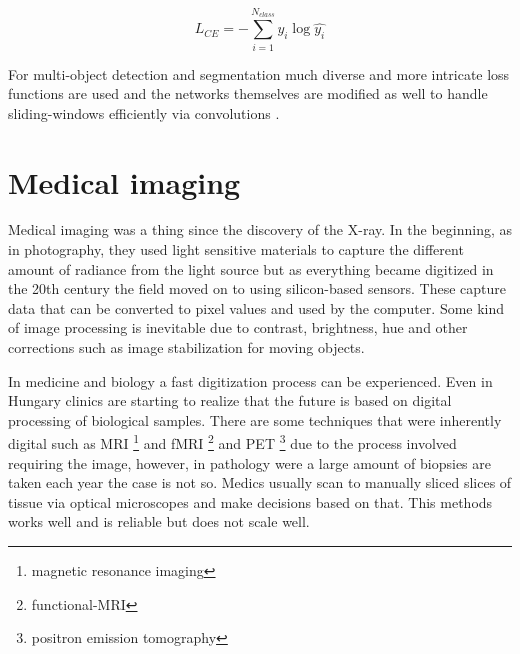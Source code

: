 \documentclass[a4paper,12pt]{article}
\begin{document}
\begin{equation}
    L_{CE} = - \sum_{i = 1}^{N_{class}} y_{i}\log\hat{y_{i}}
\end{equation}

\vspace{4mm}

\par For multi-object detection and segmentation much diverse and more intricate loss functions are used and the networks themselves \cite{ren2015faster} are modified as well to handle sliding-windows efficiently via convolutions \cite{redmon2016you}.

\vspace{7mm}

\section{Medical imaging}

\vspace{7mm}

\par Medical imaging was a thing since the discovery of the X-ray. In the beginning, as in photography, they used light sensitive materials to capture the different amount of radiance from the light source but as everything became digitized in the 20th century the field moved on to using silicon-based sensors. These capture data that can be converted to pixel values and used by the computer. Some kind of image processing is inevitable due to contrast, brightness, hue and other corrections such as image stabilization for moving objects.

\vspace{4mm}

\par In medicine and biology a fast digitization process can be experienced. Even in Hungary clinics are starting to realize that the future is based on digital processing of biological samples. There are some techniques that were inherently digital such as MRI \footnote{magnetic resonance imaging} and fMRI \footnote{functional-MRI} and PET \footnote{positron emission tomography} due to the process involved requiring the image, however, in pathology were a large amount of biopsies are taken each year the case is not so. Medics usually scan to manually sliced slices of tissue via optical microscopes and make decisions based on that. This methods works well and is reliable but does not scale well. 

\vspace{4mm}
\end{document}
